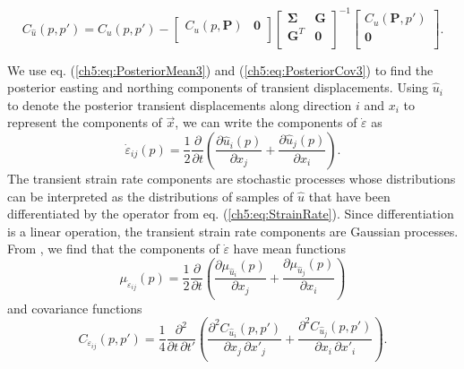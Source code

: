 \begin{equation}\label{ch5:eq:PosteriorCov3}
C_{\hat{u}}(p,p') = C_u(p,p') - 
                    \left[\begin{array}{cc}
                          C_u(p,\mathbf{P}) & \mathbf{0} \\
                          \end{array}\right]
                    \left[\begin{array}{cc}
                          \mathbf{\Sigma} & \mathbf{G} \\
                          \mathbf{G}^T  & \mathbf{0} \\
                          \end{array}\right]^{-1}
                    \left[\begin{array}{c}
                          C_u(\mathbf{P},p') \\
                          \mathbf{0} \\
                          \end{array}\right].
\end{equation}

We use eq. (\ref{ch5:eq:PosteriorMean3}) and
(\ref{ch5:eq:PosteriorCov3}) to find the posterior easting and
northing components of transient displacements. Using $\hat{u}_i$ to
denote the posterior transient displacements along direction $i$ and
$x_i$ to represent the components of $\vec{x}$, we can write the
components of $\dot\varepsilon$ as
\begin{equation}\label{ch5:eq:StrainRate}
\dot\varepsilon_{ij}(p) = \frac{1}{2} \frac{\partial}{\partial t} \left(
                                        \frac{\partial \hat{u}_i(p)}{\partial x_j} +  
                                        \frac{\partial \hat{u}_j(p)}{\partial x_i}\right).
\end{equation}
The transient strain rate components are stochastic processes whose
distributions can be interpreted as the distributions of samples of
$\hat{u}$ that have been differentiated by the operator from eq.
(\ref{ch5:eq:StrainRate}). Since differentiation is a linear
operation, the transient strain rate components are Gaussian
processes. From \citet[sec. 10.2]{Papoulis1991}, we find that the
components of $\dot{\varepsilon}$ have mean functions
\begin{equation}\label{ch5:eq:StrainMean}
\mu_{\dot\varepsilon_{ij}}(p) = \frac{1}{2}\frac{\partial}{\partial t}\left(
                                  \frac{\partial \mu_{\hat{u}_i}(p)}{\partial x_j} + 
                                  \frac{\partial \mu_{\hat{u}_j}(p)}{\partial x_i} \right)
\end{equation} 
and covariance functions
\begin{equation}\label{ch5:eq:StrainCov}
C_{\dot\varepsilon_{ij}}(p,p') = \frac{1}{4} \frac{\partial^2}{\partial t \, \partial t'}\left(
                                   \frac{\partial^2 C_{\hat{u}_i}(p,p')}{\partial x_j \, \partial x'_j} + 
                                   \frac{\partial^2 C_{\hat{u}_j}(p,p')}{\partial x_i \, \partial x'_i} \right).
\end{equation} 

